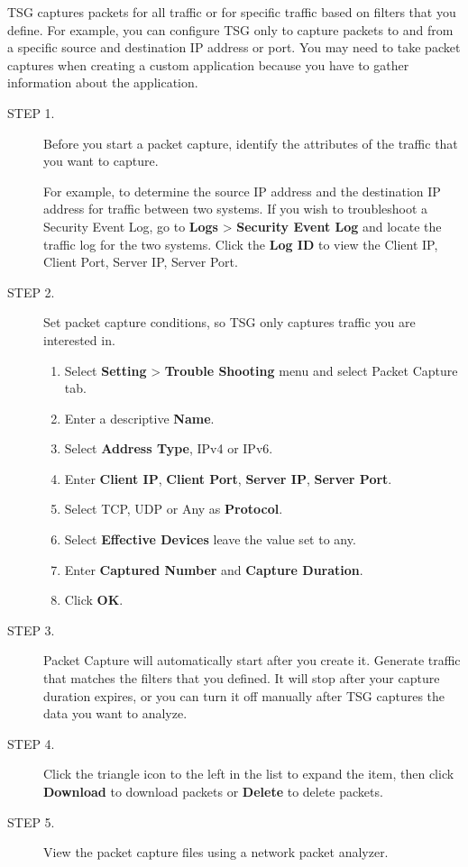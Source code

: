 TSG captures packets for all traffic or for specific traffic based on filters that you define. 
For example, you can configure TSG only to capture packets to and from a specific source and destination IP address or port. 
You may need to take packet captures when creating a custom application because you have to gather information about the application.

\begin{description}
    \item[STEP 1.]	Before you start a packet capture, identify the attributes of the traffic that you want to capture.


    For example, to determine the source IP address and the destination IP address for traffic between two systems. 
    If you wish to troubleshoot a Security Event Log, go to \textbf{Logs} > \textbf{Security Event Log} and locate the traffic log for the two systems. 
    Click the \textbf{Log ID} to view the Client IP, Client Port, Server IP, Server Port.
    \item[STEP 2.]	Set packet capture conditions, so TSG only captures traffic you are interested in.
    \begin{enumerate}
        \item Select \textbf{Setting} > \textbf{Trouble Shooting} menu and select Packet Capture tab.
        \item Enter a descriptive \textbf{Name}.
        \item Select \textbf{Address Type}, IPv4 or IPv6.
        \item Enter \textbf{Client IP}, \textbf{Client Port}, \textbf{Server IP}, \textbf{Server Port}.
        \item Select TCP, UDP or Any as \textbf{Protocol}.
        \item Select \textbf{Effective Devices} leave the value set to any.
        \item Enter \textbf{Captured Number} and \textbf{Capture Duration}.
        \item Click \textbf{OK}.
    \end{enumerate} 
    \item[STEP 3.]	Packet Capture will automatically start after you create it. Generate traffic that matches the filters that you defined. 
    It will stop after your capture duration expires, or you can turn it off manually after TSG captures the data you want to analyze.
    \item[STEP 4.]	Click the triangle icon to the left in the list to expand the item, then click \textbf{Download} to download packets or \textbf{Delete} to delete packets.
    \item[STEP 5.]	View the packet capture files using a network packet analyzer.
\end{description}